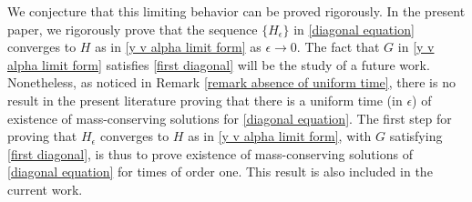 \documentclass[11pt]{article}
\numberwithin{equation}{section}
\newcommand{\der}{\textup{d}}
\begin{document}
We conjecture that this limiting behavior can be proved rigorously. In the present paper, we rigorously prove that the sequence $\{H_{\epsilon}\}$ in \eqref{diagonal equation} converges to $H$ as in \eqref{y v alpha limit form} as $\epsilon\rightarrow 0$. The fact that $G$ in \eqref{y v alpha limit form} satisfies \eqref{first diagonal} will be the study of a future work. Nonetheless, as noticed in Remark \ref{remark absence of uniform time}, there is no result in the present literature proving that there is a uniform time (in $\epsilon$) of existence of mass-conserving solutions for \eqref{diagonal equation}. The first step for proving that $H_{\epsilon}$ converges to $H$ as in \eqref{y v alpha limit form}, with $G$ satisfying \eqref{first diagonal}, is thus to prove existence of mass-conserving solutions of \eqref{diagonal equation} for times of order one. This result is also included in the current work.

\end{document}
